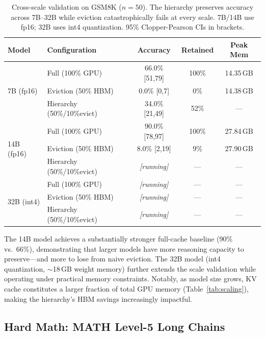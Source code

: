 \documentclass{article}
\begin{document}
\begin{table}[t]
\centering
\caption{Cross-scale validation on GSM8K ($n=50$). The hierarchy preserves accuracy across 7B--32B while eviction catastrophically fails at every scale. 7B/14B use fp16; 32B uses int4 quantization. 95\% Clopper-Pearson CIs in brackets.}
\label{tab:scale}
\vskip 0.1in
\small
\begin{tabular}{llccc}
\toprule
\textbf{Model} & \textbf{Configuration} & \textbf{Accuracy} & \textbf{Retained} & \textbf{Peak Mem} \\
\midrule
\multirow{3}{*}{7B (fp16)} & Full (100\% GPU) & 66.0\% {\scriptsize[51,79]} & 100\% & 14.35\,GB \\
& Eviction (50\% HBM) & 0.0\% {\scriptsize[0,7]} & 0\% & 14.38\,GB \\
& Hierarchy (50\%/10\%evict) & 34.0\% {\scriptsize[21,49]} & 52\% & --- \\
\midrule
\multirow{3}{*}{14B (fp16)} & Full (100\% GPU) & 90.0\% {\scriptsize[78,97]} & 100\% & 27.84\,GB \\
& Eviction (50\% HBM) & 8.0\% {\scriptsize[2,19]} & 9\% & 27.90\,GB \\
& Hierarchy (50\%/10\%evict) & \textit{[running]} & --- & --- \\
\midrule
\multirow{3}{*}{32B (int4)} & Full (100\% GPU) & \textit{[running]} & --- & --- \\
& Eviction (50\% HBM) & \textit{[running]} & --- & --- \\
& Hierarchy (50\%/10\%evict) & \textit{[running]} & --- & --- \\
\bottomrule
\end{tabular}
\end{table}

The 14B model achieves a substantially stronger full-cache baseline (90\% vs.\ 66\%), demonstrating that larger models have more reasoning capacity to preserve---and more to lose from naive eviction.
The 32B model (int4 quantization, ${\sim}$18\,GB weight memory) further extends the scale validation while operating under practical memory constraints.
Notably, as model size grows, KV cache constitutes a larger fraction of total GPU memory (Table~\ref{tab:scaling}), making the hierarchy's HBM savings increasingly impactful.

\subsection{Hard Math: MATH Level-5 Long Chains}
\label{sec:aime}
\end{document}
